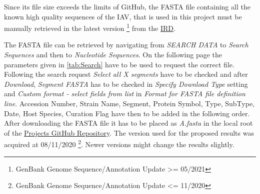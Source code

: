 Since its file size exceeds the limits of GitHub, the FASTA file containing all the known high quality sequences of the \gls{IAV}, that is used in this project must be manually retrieved in the latest version \footnote{GenBank Genome Sequence/Annotation Update >= 05/2021} from the \href{https://www.fludb.org/brc/home.spg?decorator=influenza}{\gls{IRD}}.

\begin{table}[!hbt]
    \centering
    \caption[Search Parameter for FASTA file]{\textbf{Search Parameter for FASTA file.} The parameters to use on the nucleotide sequence search interface of the \href{https://www.fludb.org/brc/home.spg?decorator=influenza}{Influenza Research Database}. All paremeters have to be precisely as listed for a exact replication of the FASTA file used in this project.}
    \label{tab:Search}
\end{table}

The FASTA file can be retrieved by navigating from \textit{SEARCH DATA} to \textit{Search Sequences} and then to \textit{Nucleotide Sequences}. On the following page the parameters given in \autoref{tab:Search} have to be used to request the correct file. Following the search request \textit{Select all X segments} have to be checked and after \textit{Download}, \textit{Segment FASTA} has to be checked in \textit{Specify Download Type} setting and \textit{Custom format - select fields from list} in \textit{Format for FASTA file definition line}. Accession Number, Strain Name, Segment, Protein Symbol, Type, SubType, Date, Host Species, Curation Flag have then to be added in the following order. After downloading the FASTA file it has to be placed as \textit{A.fasta} in the local root of the \href{https://github.com/ahenoch/Masterthesis.git}{Projects GitHub Repository}. The version used for the proposed results was acquired at 08/11/2020 \footnote{GenBank Genome Sequence/Annotation Update <= 11/2020 }. Newer versions might change the results slightly.

